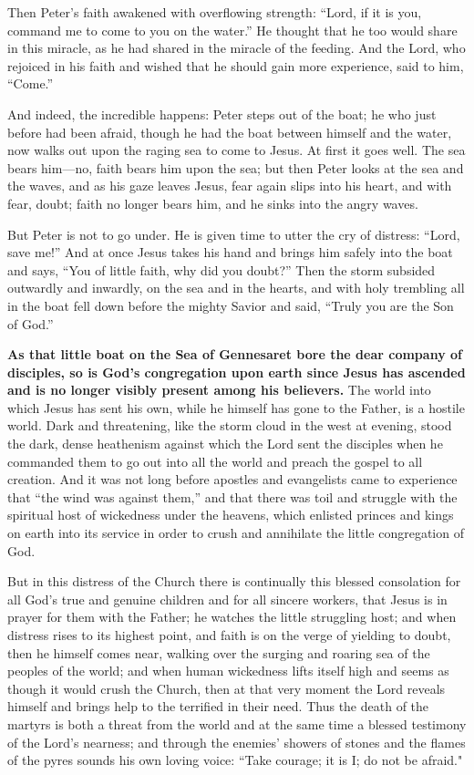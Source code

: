 Then Peter’s faith awakened with overflowing strength: “Lord, if it is you, command me to come to you on the water.” He thought that he too would share in this miracle, as he had shared in the miracle of the feeding. And the Lord, who rejoiced in his faith and wished that he should gain more experience, said to him, “Come.”

And indeed, the incredible happens: Peter steps out of the boat; he who just before had been afraid, though he had the boat between himself and the water, now walks out upon the raging sea to come to Jesus. At first it goes well. The sea bears him—no, faith bears him upon the sea; but then Peter looks at the sea and the waves, and as his gaze leaves Jesus, fear again slips into his heart, and with fear, doubt; faith no longer bears him, and he sinks into the angry waves.

But Peter is not to go under. He is given time to utter the cry of distress: “Lord, save me!” And at once Jesus takes his hand and brings him safely into the boat and says, “You of little faith, why did you doubt?” Then the storm subsided outwardly and inwardly, on the sea and in the hearts, and with holy trembling all in the boat fell down before the mighty Savior and said, “Truly you are the Son of God.”

\textbf{As that little boat on the Sea of Gennesaret bore the dear company of disciples, so is God’s congregation upon earth since Jesus has ascended and is no longer visibly present among his believers.} The world into which Jesus has sent his own, while he himself has gone to the Father, is a hostile world. Dark and threatening, like the storm cloud in the west at evening, stood the dark, dense heathenism against which the Lord sent the disciples when he commanded them to go out into all the world and preach the gospel to all creation. And it was not long before apostles and evangelists came to experience that “the wind was against them,” and that there was toil and struggle with the spiritual host of wickedness under the heavens, which enlisted princes and kings on earth into its service in order to crush and annihilate the little congregation of God.

But in this distress of the Church there is continually this blessed consolation for all God’s true and genuine children and for all sincere workers, that Jesus is in prayer for them with the Father; he watches the little struggling host; and when distress rises to its highest point, and faith is on the verge of yielding to doubt, then he himself comes near, walking over the surging and roaring sea of the peoples of the world; and when human wickedness lifts itself high and seems as though it would crush the Church, then at that very moment the Lord reveals himself and brings help to the terrified in their need. Thus the death of the martyrs is both a threat from the world and at the same time a blessed testimony of the Lord’s nearness; and through the enemies’ showers of stones and the flames of the pyres sounds his own loving voice: “Take courage; it is I; do not be afraid."

